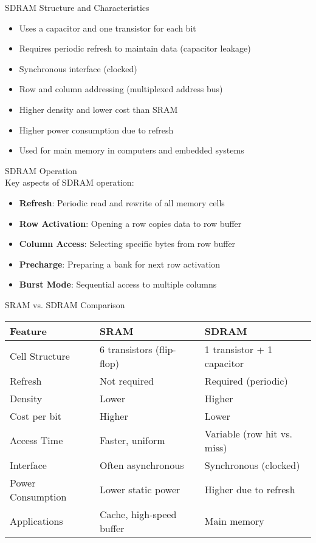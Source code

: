 \begin{concept}{SDRAM Structure and Characteristics}
\begin{itemize}
    \item Uses a capacitor and one transistor for each bit
    \item Requires periodic refresh to maintain data (capacitor leakage)
    \item Synchronous interface (clocked)
    \item Row and column addressing (multiplexed address bus)
    \item Higher density and lower cost than SRAM
    \item Higher power consumption due to refresh
    \item Used for main memory in computers and embedded systems
\end{itemize}
\end{concept}

\begin{definition}{SDRAM Operation}\\
Key aspects of SDRAM operation:
\begin{itemize}
    \item \textbf{Refresh}: Periodic read and rewrite of all memory cells
    \item \textbf{Row Activation}: Opening a row copies data to row buffer
    \item \textbf{Column Access}: Selecting specific bytes from row buffer
    \item \textbf{Precharge}: Preparing a bank for next row activation
    \item \textbf{Burst Mode}: Sequential access to multiple columns
\end{itemize}
\end{definition}

\multend

\begin{theorem}{SRAM vs. SDRAM Comparison}
\begin{center}
\begin{tabular}{|p{3cm}|p{4cm}|p{4cm}|}
\hline
\textbf{Feature} & \textbf{SRAM} & \textbf{SDRAM} \\
\hline
Cell Structure & 6 transistors (flip-flop) & 1 transistor + 1 capacitor \\
\hline
Refresh & Not required & Required (periodic) \\
\hline
Density & Lower & Higher \\
\hline
Cost per bit & Higher & Lower \\
\hline
Access Time & Faster, uniform & Variable (row hit vs. miss) \\
\hline
Interface & Often asynchronous & Synchronous (clocked) \\
\hline
Power Consumption & Lower static power & Higher due to refresh \\
\hline
Applications & Cache, high-speed buffer & Main memory \\
\hline
\end{tabular}
\end{center}
\end{theorem}


